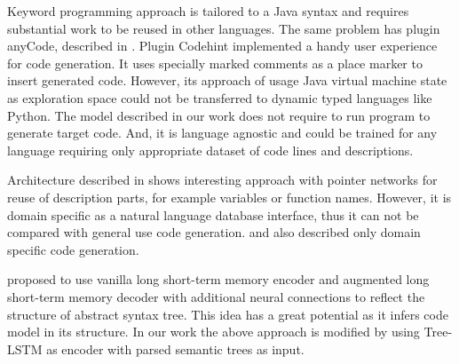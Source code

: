 Keyword programming approach \parencite{little2009keyword} is tailored to a Java syntax and requires substantial work to be reused in other languages. The same problem has plugin anyCode, described in \cite{Gvero2015}. Plugin Codehint \parencite{Galenson2014} implemented a handy user experience for code generation. It uses specially marked comments as a place marker to insert generated code. However, its approach of usage Java virtual machine state as exploration space could not be transferred to dynamic typed languages like Python. The model described in our work does not require to run program to generate target code. And, it is language agnostic and could be trained for any language requiring only appropriate dataset of code lines and descriptions.

Architecture described in \cite{Zhong2017} shows interesting approach with pointer networks for reuse of description parts, for example variables or function names. However, it is domain specific as a natural language database interface, thus it can not be compared with general use code generation. \cite{Chen2016} and \cite{Ling2016} also described only domain specific code generation.

\cite{Yin2017} proposed to use vanilla long short-term memory encoder and augmented long short-term memory decoder with additional neural connections to reflect the structure of abstract syntax tree. This idea has a great potential as it infers code model in its structure. In our work the above approach is modified by using Tree-LSTM as encoder with parsed semantic trees as input.

